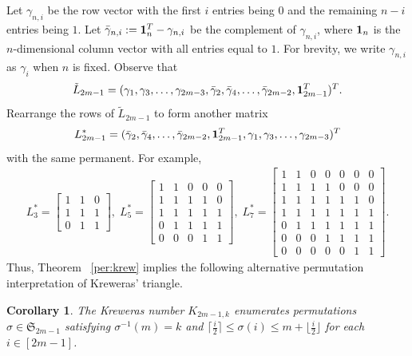 \documentclass[11pt,reqno]{amsart}
\numberwithin{equation}{section}
\theoremstyle{plain}
\newtheorem{corollary}[theorem]{Corollary}
\theoremstyle{definition}
\renewcommand{\S}{\mathfrak{S}}
\begin{document}
Let $\gamma_{n,i}$ be the row vector with the first $i$ entries being $0$ and the remaining $n-i$ entries being $1$. Let  $\bar\gamma_{n,i}:={\bf1}^T_n-\gamma_{n,i}$ be the complement of $\gamma_{n,i}$, where  ${\bf1}_n$ is the $n
$-dimensional column vector with all entries equal to $1$.  For brevity,  we write $\gamma_{n,i}$ as $\gamma_i$ when $n$ is fixed. Observe that
$$
\tilde{L}_{2m-1}=(\gamma_1,\gamma_3,\ldots,\gamma_{2m-3},\bar\gamma_2,\bar\gamma_4,\ldots,\bar\gamma_{2m-2},{\bf1}^T_{2m-1})^T.
$$
Rearrange the rows of $\tilde{L}_{2m-1}$ to form another matrix
$$
L^{\ast}_{2m-1}=(\bar\gamma_2,\bar\gamma_4,\ldots,\bar\gamma_{2m-2},{\bf1}^T_{2m-1},\gamma_1,\gamma_3,\ldots,\gamma_{2m-3})^T
$$ with the same permanent. For example,
\begin{align*}
L^{\ast}_3=\begin{bmatrix}
1 & 1 & 0 \\
1 & 1 & 1\\
0 & 1 & 1
\end{bmatrix},
\;
L^{\ast}_5=\begin{bmatrix}
1 & 1 & 0 & 0 & 0\\
1 & 1 & 1 & 1 & 0\\
1 & 1 & 1 & 1 & 1\\
0 & 1 & 1 & 1 & 1\\
0 & 0 & 0 & 1 & 1
\end{bmatrix},
\;
L^{\ast}_7=\begin{bmatrix}
1 & 1 & 0 & 0 & 0 & 0 & 0\\
1 & 1 & 1 & 1 & 0 & 0 & 0\\
1 & 1 & 1 & 1 & 1 & 1 & 0\\
1 & 1 & 1 & 1 & 1 & 1 & 1\\
0 & 1 & 1 & 1 & 1 & 1 & 1\\
0 & 0 & 0 & 1 & 1 & 1 & 1\\
0 & 0 & 0 & 0 & 0 & 1 & 1
\end{bmatrix}.
\end{align*}
 Thus, Theorem ~\ref{per:krew} implies the following alternative permutation  interpretation of Kreweras' triangle.

\begin{corollary}
The Kreweras number  $K_{2m-1,k}$ enumerates permutations $\sigma\in\S_{2m-1}$ satisfying $\sigma^{-1}(m)=k$ and $\lceil\frac{i}{2}\rceil\leq\sigma(i)\leq m+\lfloor\frac{i}{2}\rfloor$ for each $i\in[2m-1]$.
\end{corollary}
\end{document}
